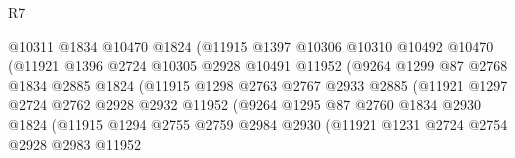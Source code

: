\begin{lexlean}{R7}
\begin{coremodule}
                                @10311
                                @1834
                                @10470
                                @1824
                                (@11915
                                  @1397
                                  @10306
                                  @10310
                                  @10492
                                  @10470
                                  (@11921
                                    @1396
                                    @2724
                                    @10305
                                    @2928
                                    @10491
                                    @11952
                                    (@9264
                                      @1299
                                      @87
                                      @2768
                                      @1834
                                      @2885
                                      @1824
                                      (@11915
                                        @1298
                                        @2763
                                        @2767
                                        @2933
                                        @2885
                                        (@11921
                                          @1297
                                          @2724
                                          @2762
                                          @2928
                                          @2932
                                          @11952
                                          (@9264
                                            @1295
                                            @87
                                            @2760
                                            @1834
                                            @2930
                                            @1824
                                            (@11915
                                              @1294
                                              @2755
                                              @2759
                                              @2984
                                              @2930
                                              (@11921
                                                @1231
                                                @2724
                                                @2754
                                                @2928
                                                @2983
                                                @11952

\end{coremodule}
\end{lexlean}
